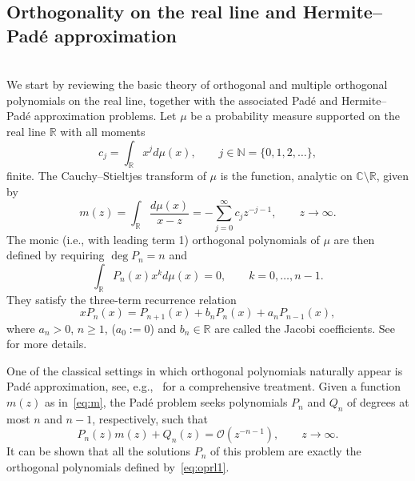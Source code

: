 \documentclass[reqno,centertags,11pt,draft]{amsart}
\newcommand{\R}{\mathbb{R}}
\newcommand{\C}{\mathbb C}
\newcommand{\N}{\mathbb{N}}
\begin{document}


\subsection{Orthogonality on the real line and Hermite--Pad\'{e} approximation}\label{ss:intro1}
\hfill\\

We start by reviewing the basic theory of orthogonal and multiple orthogonal polynomials on the real line, together with the associated Pad\'{e} and Hermite--Pad\'{e} approximation problems. 
Let $\mu$ be a probability measure supported on the real line $\R$ with all  moments 
$$
c_j = \int_\R x^j d\mu(x), \qquad j\in\N=\{0,1,2,\ldots\},
$$
finite. The Cauchy--Stieltjes transform of $\mu$ is the function, analytic on $\C\setminus\R$, given by
\begin{equation}
    \label{eq:m}
m(z) = \int_{\R} \frac{d\mu(x)}{x-z} = -\sum_{j=0}^\infty c_j z^{-j-1}, \qquad z\to\infty. 
\end{equation}
The monic (i.e., with leading term 1) orthogonal polynomials %
of $\mu$ are then defined by requiring $\deg{P_n} = n$ and
\begin{equation}\label{eq:oprl1}
    \int_\R P_n(x)x^{k} d\mu(x) = 0, \qquad k = 0,\dots,n-1.
\end{equation}
They satisfy the three-term recurrence relation
\begin{equation}
    x P_{n}(x) = P_{n+1}(x) + b_n P_n(x) + a_n P_{n-1}(x),
\end{equation}
where $a_n>0$, $n\ge 1$, ($a_0:=0$) and $b_n\in\R$ are called the Jacobi coefficients.
See~\cite{SzegoBook,SimonL2} for more details.

One of the classical settings in which orthogonal polynomials naturally appear is Pad\'{e} approximation, see, e.g.,~\cite{Baker} for a comprehensive treatment.
Given a function $m(z)$ as in~\eqref{eq:m}, the Pad\'{e} problem seeks polynomials $P_n$ and $Q_n$ of degrees at most $n$ and $n-1$, respectively, such that
\begin{equation}\label{eq:padeR}
P_n(z) m(z) +Q_n(z) = \mathcal{O}(z^{-n-1}), \qquad z \to \infty.
\end{equation}
It can be shown that all the %
solutions $P_n$ of %
this problem are exactly the orthogonal polynomials defined by~\eqref{eq:oprl1}.
\end{document}
